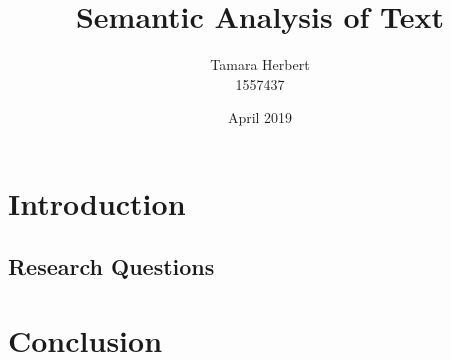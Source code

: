 \documentclass{article}
\title{Semantic Analysis of Text}
\author{Tamara Herbert \\ 1557437}
\date{April 2019}
\begin{document}
\maketitle

\tableofcontents

\pagebreak

\section{Introduction}
\subsection{Research Questions}




\section{Conclusion}




\end{document}
